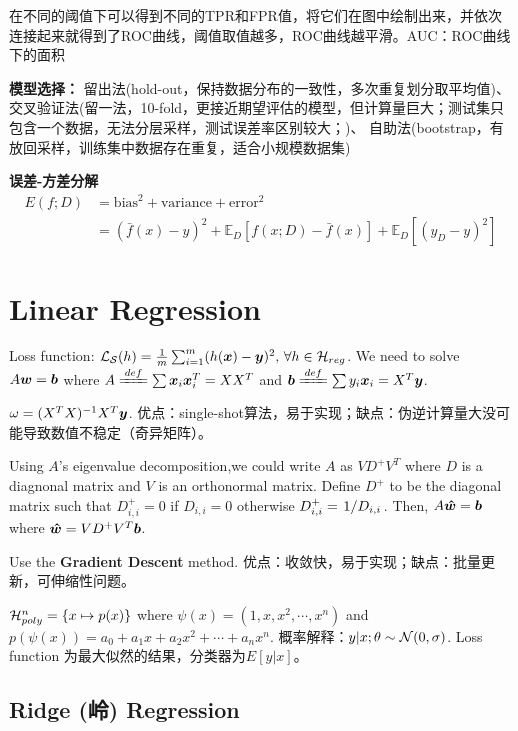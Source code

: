 \documentclass[a4paper,landscape]{article}
\begin{document}
\begin{tiny}
\begin{multicols}{4}
		在不同的阈值下可以得到不同的TPR和FPR值，将它们在图中绘制出来，并依次连接起来就得到了ROC曲线，阈值取值越多，ROC曲线越平滑。AUC：ROC曲线下的面积


		\textbf{模型选择：}
		留出法(hold-out，保持数据分布的一致性，多次重复划分取平均值)、
		交叉验证法(留一法，10-fold，更接近期望评估的模型，但计算量巨大；测试集只包含一个数据，无法分层采样，测试误差率区别较大；)、
		自助法(bootstrap，有放回采样，训练集中数据存在重复，适合小规模数据集)

		\textbf{误差-方差分解}
		\[
			\begin{aligned}
				E(f;D) & =\mathrm{bias}^2+\mathrm{variance}+\mathrm{error}^2
				\\&=(\bar{f}(x)-y)^2+\mathbb{E}_D[f(x; D)-\bar{f}(x)]+\mathbb{E}_D[(y_D-y)^2]
			\end{aligned}
		\]
		\section{Linear Regression}

		Loss function: $\mathcal{L}_{\mathcal{S}}(h)=\frac{1}{m}\sum_{i=1}^m(h(\boldsymbol{x})-\boldsymbol{y})^2\mbox{, }\forall h\in\mathcal{H}_{reg}$.
		We need to solve $A\boldsymbol{w}=\boldsymbol{b}$ where $A\deq\sum\*x_i\*x_i^T=XX^T$ and $\*b\deq\sum y_i\*x_i=X^T\*y$.

		\begin{thm}
			$\omega=(X^TX)^{-1}X^T\boldsymbol{y}$. 优点：single-shot算法，易于实现；缺点：伪逆计算量大没可能导致数值不稳定（奇异矩阵）。
		\end{thm}

		\begin{thm}
			\label{non-inv}
			Using $A$'s eigenvalue decomposition,we could write $A$ as $VD^+V^T$ where $D$ is a diagnonal matrix and  $V$ is an orthonormal matrix. Define $D^+$ to be the diagonal matrix such that $D^+_{i,i}=0$ if  $D_{i,i}=0$ otherwise  $D^+_{i,i}=\flatfrac{1}{D_{i,i}}$. Then, $A\boldsymbol{\hat{w}}=\boldsymbol{b}$ where $\boldsymbol{\hat{w}}=VD^+V^T\boldsymbol{b}$.
		\end{thm}

		\begin{remark}
			Use the \textbf{Gradient Descent} method. 优点：收敛快，易于实现；缺点：批量更新，可伸缩性问题。
		\end{remark}
		$\mathcal{H}^n_{poly}=\qty{x\mapsto p(x)}$ where $\psi(x)=(1,x,x^2,\cdots,x^n)$ and $p(\psi(x))=a_0+a_1x+a_2x^2+\cdots+a_nx^n$.
		概率解释：$y|x;\theta\sim\mathcal{N}(0,\sigma)$. Loss function 为最大似然的结果，分类器为$E[y|x]$。

		\subsection{Ridge (岭) Regression}


\end{multicols}
\end{tiny}
\end{document}
